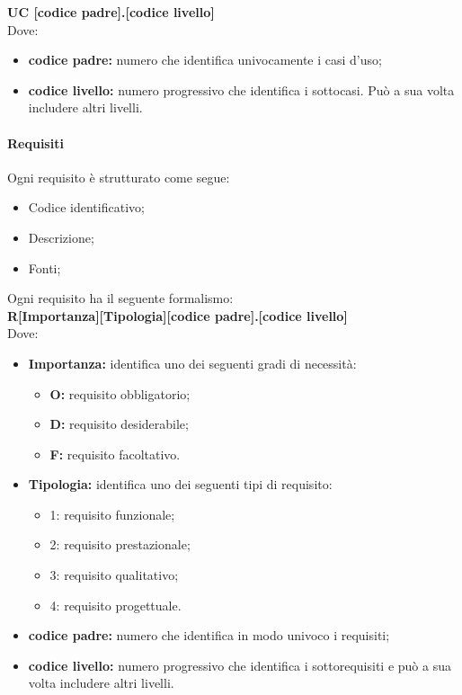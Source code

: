 \textbf{ UC [codice padre].[codice livello]} \\ 

Dove:
\begin{itemize}
\item{\textbf{ codice padre:}}  numero che identifica univocamente i casi d’uso;
\item{\textbf{ codice livello:}}  numero progressivo che identifica i sottocasi. Può a sua volta includere altri livelli.
\end{itemize}
\paragraph{Requisiti}
Ogni requisito è strutturato come segue:

\begin{itemize}
	\item Codice identificativo;
	\item Descrizione;
	\item Fonti;
\end{itemize}
Ogni requisito ha il seguente formalismo:\\

\textbf{ R[Importanza][Tipologia][codice padre].[codice livello]} \\

Dove:
\begin{itemize}
	\item \textbf{Importanza:} identifica uno dei seguenti gradi di necessità:
	\begin{itemize}
		\item \textbf{O:} requisito obbligatorio;
		\item \textbf{D:} requisito desiderabile;
		\item \textbf{F:} requisito facoltativo.
		
	\end{itemize}
	\item \textbf{Tipologia:}  identifica uno dei seguenti tipi di requisito:
	\begin{itemize}
	\item 1: requisito funzionale;
	\item 2: requisito prestazionale;
	\item 3: requisito qualitativo;
	\item 4: requisito progettuale.
	
	\end{itemize}
	\item \textbf{codice padre:} numero che identifica in modo univoco i requisiti;
	\item \textbf{codice livello:} numero progressivo che identifica i sottorequisiti e può a sua volta includere altri livelli.
\end{itemize}

